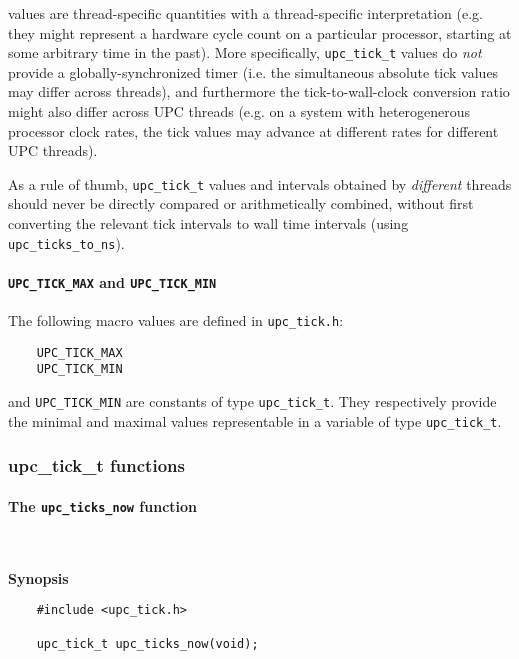  values are thread-specific quantities with a thread-specific
interpretation (e.g. they might represent a
hardware cycle count on a particular processor, starting at some arbitrary time in
the past).  More specifically,  {\tt upc\_tick\_t} values do {\it not} provide a
globally-synchronized timer (i.e. the simultaneous absolute tick values may
differ across threads), and furthermore the tick-to-wall-clock conversion ratio
might also differ across UPC threads (e.g. on a system with heterogenerous processor
clock rates, the tick values may advance at different rates for different UPC
threads). 

\np As a rule of thumb, {\tt upc\_tick\_t} values and intervals
obtained by {\it different} threads should never be directly
compared or arithmetically combined, without first converting the relevant tick
intervals to wall time intervals (using {\tt upc\_ticks\_to\_ns}).

\paragraph{{\tt UPC\_TICK\_MAX} and {\tt UPC\_TICK\_MIN}}

\npf The following macro values are defined in {\tt upc\_tick.h}:

\begin{verbatim}
    UPC_TICK_MAX
    UPC_TICK_MIN
\end{verbatim}

 and {\tt UPC\_TICK\_MIN} are constants of type {\tt upc\_tick\_t}.
They respectively provide the
minimal and maximal values representable in a variable of type {\tt upc\_tick\_t}.

\subsubsection{upc\_tick\_t functions}

\paragraph{The {\tt upc\_ticks\_now} function}\ \\
\label{upc-ticks-now}

{\bf Synopsis}

\npf\vspace{-2.5em}
 \begin{verbatim}
    #include <upc_tick.h>

    upc_tick_t upc_ticks_now(void);
\end{verbatim}

